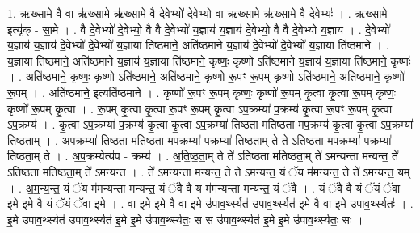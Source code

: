 \documentclass[17pt]{extarticle}
\begin{document}
1. ऋ॒ख्सा॒मे वै वा ऋ॑ख्सा॒मे ऋ॑ख्सा॒मे वै दे॒वेभ्यो॑ दे॒वेभ्यो॒ वा ऋ॑ख्सा॒मे ऋ॑ख्सा॒मे वै दे॒वेभ्यः॑ । . ऋ॒ख्सा॒मे इत्यृ॑क् - सा॒मे । . वै दे॒वेभ्यो॑ दे॒वेभ्यो॒ वै वै दे॒वेभ्यो॑ य॒ज्ञाय॑ य॒ज्ञाय॑ दे॒वेभ्यो॒ वै वै दे॒वेभ्यो॑ य॒ज्ञाय॑ । . दे॒वेभ्यो॑ य॒ज्ञाय॑ य॒ज्ञाय॑ दे॒वेभ्यो॑ दे॒वेभ्यो॑ य॒ज्ञाया ति॑ष्ठमाने॒ अति॑ष्ठमाने य॒ज्ञाय॑ दे॒वेभ्यो॑ दे॒वेभ्यो॑ य॒ज्ञाया ति॑ष्ठमाने । . य॒ज्ञाया ति॑ष्ठमाने॒ अति॑ष्ठमाने य॒ज्ञाय॑ य॒ज्ञाया ति॑ष्ठमाने॒ कृष्णः॒ कृष्णो ऽति॑ष्ठमाने य॒ज्ञाय॑ य॒ज्ञाया ति॑ष्ठमाने॒ कृष्णः॑ । . अति॑ष्ठमाने॒ कृष्णः॒ कृष्णो ऽति॑ष्ठमाने॒ अति॑ष्ठमाने॒ कृष्णो॑ रू॒पꣳ रू॒पम् कृष्णो ऽति॑ष्ठमाने॒ अति॑ष्ठमाने॒ कृष्णो॑ रू॒पम् । . अति॑ष्ठमाने॒ इत्यति॑ष्ठमाने । . कृष्णो॑ रू॒पꣳ रू॒पम् कृष्णः॒ कृष्णो॑ रू॒पम् कृ॒त्वा कृ॒त्वा रू॒पम् कृष्णः॒ कृष्णो॑ रू॒पम् कृ॒त्वा । . रू॒पम् कृ॒त्वा कृ॒त्वा रू॒पꣳ रू॒पम् कृ॒त्वा ऽप॒क्रम्या॑ प॒क्रम्य॑ कृ॒त्वा रू॒पꣳ रू॒पम् कृ॒त्वा ऽप॒क्रम्य॑ । . कृ॒त्वा ऽप॒क्रम्या॑ प॒क्रम्य॑ कृ॒त्वा कृ॒त्वा ऽप॒क्रम्या॑ तिष्ठता मतिष्ठता मप॒क्रम्य॑ कृ॒त्वा कृ॒त्वा ऽप॒क्रम्या॑ तिष्ठताम् । . अ॒प॒क्रम्या॑ तिष्ठता मतिष्ठता मप॒क्रम्या॑ प॒क्रम्या॑ तिष्ठता॒म् ते ते॑ ऽतिष्ठता मप॒क्रम्या॑ प॒क्रम्या॑ तिष्ठता॒म् ते । . अ॒प॒क्रम्येत्य॑प - क्रम्य॑ । . अ॒ति॒ष्ठ॒ता॒म् ते ते॑ ऽतिष्ठता मतिष्ठता॒म् ते॑ ऽमन्यन्ता मन्यन्त॒ ते॑ ऽतिष्ठता मतिष्ठता॒म् ते॑ ऽमन्यन्त । . ते॑ ऽमन्यन्ता मन्यन्त॒ ते ते॑ ऽमन्यन्त॒ यं ॅय म॑मन्यन्त॒ ते ते॑ ऽमन्यन्त॒ यम् । . अ॒म॒न्य॒न्त॒ यं ॅय म॑मन्यन्ता मन्यन्त॒ यं ॅवै वै य म॑मन्यन्ता मन्यन्त॒ यं ॅवै । . यं ॅवै वै यं ॅयं ॅवा इ॒मे इ॒मे वै यं ॅयं ॅवा इ॒मे । . वा इ॒मे इ॒मे वै वा इ॒मे उ॑पाव॒र्थ्स्यत॑ उपाव॒र्थ्स्यत॑ इ॒मे वै वा इ॒मे उ॑पाव॒र्थ्स्यतः॑ । . इ॒मे उ॑पाव॒र्थ्स्यत॑ उपाव॒र्थ्स्यत॑ इ॒मे इ॒मे उ॑पाव॒र्थ्स्यतः॒ स स उ॑पाव॒र्थ्स्यत॑ इ॒मे इ॒मे उ॑पाव॒र्थ्स्यतः॒ सः । \newline
\end{document}

